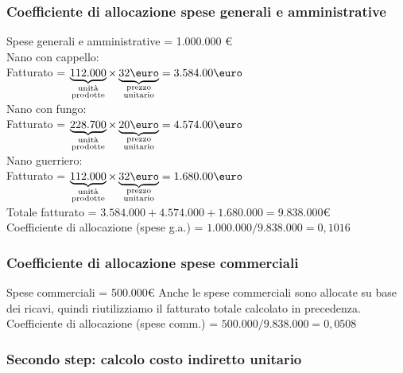 \documentclass{article}
\begin{document}
\subsubsection*{Coefficiente di allocazione spese generali e amministrative}
Spese generali e amministrative = 1.000.000 €
\vspace*{0.2cm}\\
Nano con cappello:\\
Fatturato = $\underbrace{112.000}_{\substack{\text{unità} \\ \text{prodotte}}} \times \underbrace{32 \T{\euro}}_{\substack{\text{prezzo} \\ \text{unitario}}} = 3.584.00  \T{\euro} $
\vspace*{0.1cm}\\
Nano con fungo:\\
Fatturato = $\underbrace{228.700}_{\substack{\text{unità} \\ \text{prodotte}}} \times \underbrace{20 \T{\euro}}_{\substack{\text{prezzo} \\ \text{unitario}}} = 4.574.00  \T{\euro} $
\vspace*{0.1cm}\\
Nano guerriero:\\
Fatturato = $\underbrace{112.000}_{\substack{\text{unità} \\ \text{prodotte}}} \times \underbrace{32 \T{\euro}}_{\substack{\text{prezzo} \\ \text{unitario}}} = 1.680.00 \T{\euro} $
\vspace*{0.1cm}\\
Totale fatturato = $3.584.000 + 4.574.000 + 1.680.000 = 9.838.000$\euro\\
Coefficiente di allocazione (spese g.a.) = $1.000.000/9.838.000 = 0,1016$

\subsubsection*{Coefficiente di allocazione spese commerciali}
Spese commerciali = 500.000\euro 
Anche le spese commerciali sono allocate su base dei ricavi, quindi riutilizziamo il fatturato totale calcolato in precedenza.
\vspace*{0.2cm}\\
Coefficiente di allocazione (spese comm.) = $500.000/9.838.000 = 0,0508$

\subsubsection*{Secondo step: calcolo costo indiretto unitario}
\end{document}
